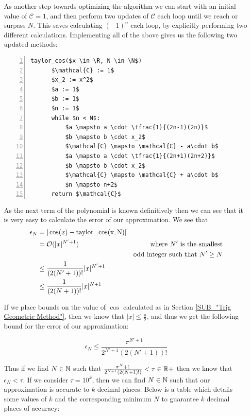 {As another step towards optimizing the algorithm we can start with an initial value of \(\mathcal{C} = 1\), and then perform two updates of \(\mathcal{C}\) each loop until we reach or surpass \(N\). This saves calculating \((-1)^n\) each loop, by explicitly performing two different calculations. Implementing all of the above gives us the following two updated methods:

\begin{lstlisting}[numbers=left,frame=single,mathescape,caption={Taylor computation of \(\cos\) optimised},label={PCD_"Taylor Cos opt"}]
  taylor_cos($x \in \R, N \in \N$)
      $\mathcal{C} := 1$
      $x_2 := x^2$
      $a := 1$
      $b := 1$
      $n := 1$
      while $n < N$:
          $a \mapsto a \cdot \tfrac{1}{(2n-1)(2n)}$
          $b \mapsto b \cdot x_2$
          $\mathcal{C} \mapsto \mathcal{C} - a\cdot b$
          $a \mapsto a \cdot \tfrac{1}{(2n+1)(2n+2)}$
          $b \mapsto b \cdot x_2$
          $\mathcal{C} \mapsto \mathcal{C} + a\cdot b$
          $n \mapsto n+2$
      return $\mathcal{C}$
\end{lstlisting}

As the next term of the polynomial is known definitively then we can see that it is very easy to calculate the error of our approximation. We see that 
\begin{displaymath}
\begin{align*}
	\epsilon_N &= |\cos(x) - \mathrm{taylor\_cos(x,N)}|\\
		&= \mathcal{O}(|x|^{N'+1}) &\textrm{where } N' \textrm{ is the smallest}\\
		&&\textrm{odd integer such that } N'\ge N\\
		&\le \frac{1}{(2(N'+1))!} |x|^{N'+1}\\
		&\le \frac{1}{(2(N+1))!} |x|^{N+1}
\end{align*}
\end{displaymath}

If we place bounds on the value of \(\cos\) calculated as in Section \ref{SUB_"Trig Geometric Method"}, then we know that \(|x| \le \frac{\pi}{2}\), and thus we get the following bound for the error of our approximation:

\[\epsilon_N \le \frac{\pi^{N' + 1}}{2^{N'+1}(2(N'+1))!}\]

Thus if we find \(N \in \mathbb{N}\) such that \(\frac{\pi^{N}+1}{2^{N+1}(2(N+1)!)} < \tau \in \mathbb{R}+\) then we know that \(\epsilon_N < \tau\). If we consider \(\tau = 10^k\), then we can find \(N \in \mathbb{N}\) such that our approximation is accurate to \(k\) decimal places. Below is a table which details some values of \(k\) and the corresponding minimum \(N\) to guarantee \(k\) decimal places of accuracy:

}
